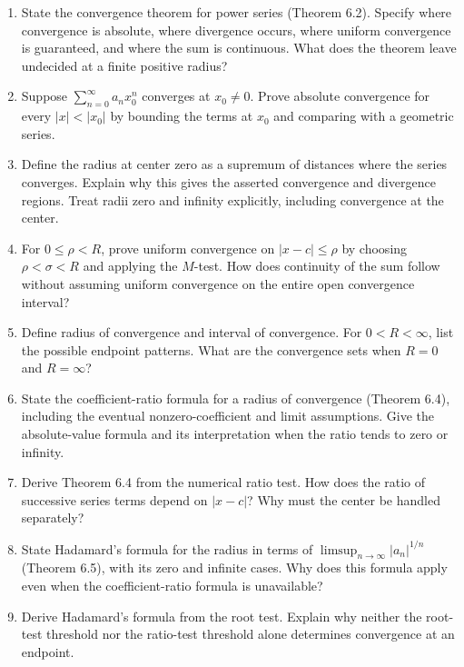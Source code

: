 \begin{enumerate}[resume]
  \item State the convergence theorem for power series (Theorem 6.2).
    Specify where convergence is absolute, where divergence occurs,
    where uniform convergence is guaranteed, and where the sum is continuous.
    What does the theorem leave undecided at a finite positive radius?

  \item Suppose \(\sum_{n=0}^{\infty}a_nx_0^n\) converges at
    \(x_0\ne0\). Prove absolute convergence for every \(|x|<|x_0|\)
    by bounding the terms at \(x_0\) and comparing with a geometric series.

  \item Define the radius at center zero as a supremum of distances
    where the series converges. Explain why this gives the asserted
    convergence and divergence regions. Treat radii zero and infinity
    explicitly, including convergence at the center.

  \item For \(0\leq\rho<R\), prove uniform convergence on
    \(|x-c|\leq\rho\) by choosing \(\rho<\sigma<R\) and applying
    the \(M\)-test. How does continuity of the sum follow without
    assuming uniform convergence on the entire open convergence interval?

  \item Define radius of convergence and interval of convergence.
    For \(0<R<\infty\), list the possible endpoint patterns.
    What are the convergence sets when \(R=0\) and \(R=\infty\)?

  \item State the coefficient-ratio formula for a radius of convergence
    (Theorem 6.4), including the eventual nonzero-coefficient and
    limit assumptions. Give the absolute-value formula and its
    interpretation when the ratio tends to zero or infinity.

  \item Derive Theorem 6.4 from the numerical ratio test.
    How does the ratio of successive series terms depend on
    \(|x-c|\)? Why must the center be handled separately?

  \item State Hadamard's formula for the radius in terms of
    \(\limsup_{n\to\infty}|a_n|^{1/n}\) (Theorem 6.5), with
    its zero and infinite cases. Why does this formula apply even
    when the coefficient-ratio formula is unavailable?

  \item Derive Hadamard's formula from the root test.
    Explain why neither the root-test threshold nor the ratio-test
    threshold alone determines convergence at an endpoint.
\end{enumerate}

